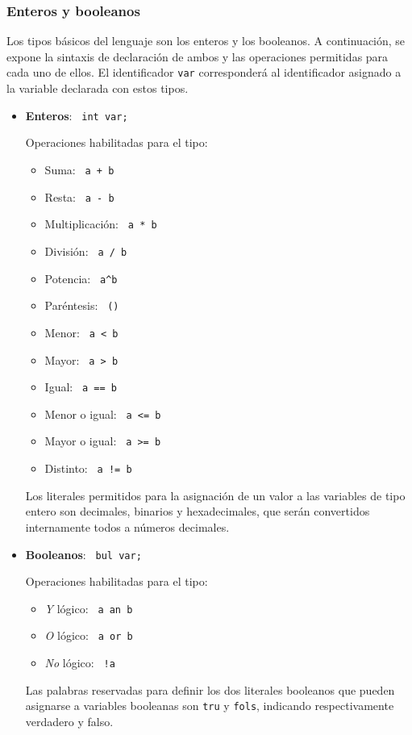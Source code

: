 \documentclass[10pt,a4paper]{article}
\begin{document}
\subsubsection{Enteros y booleanos}
Los tipos básicos del lenguaje son los enteros y los booleanos. A continuación, se expone la sintaxis de declaración de ambos y las operaciones permitidas para cada uno de ellos. El identificador \texttt{var} corresponderá al identificador asignado a la variable declarada con estos tipos.
\begin{itemize}
    \item \textbf{Enteros}: \texttt{\color{blue} int var;}
    
    Operaciones habilitadas para el tipo:
    \begin{itemize}
        \item Suma: \texttt{\color{blue} a + b}
        \item Resta: \texttt{\color{blue} a - b}
        \item Multiplicación: \texttt{\color{blue} a * b}
        \item División: \texttt{\color{blue} a / b}
        \item Potencia: \texttt{\color{blue} a\^{}b}
        \item Paréntesis: \texttt{\color{blue} ()}
        \item Menor: \texttt{\color{blue} a \textless{} b}
        \item Mayor: \texttt{\color{blue} a \textgreater{} b}
        \item Igual: \texttt{\color{blue} a == b}
        \item Menor o igual: \texttt{\color{blue} a \textless{}= b}
        \item Mayor o igual: \texttt{\color{blue} a \textgreater{}= b}
        \item Distinto: \texttt{\color{blue} a != b}
    \end{itemize}
    Los literales permitidos para la asignación de un valor a las variables de tipo entero son decimales, binarios y hexadecimales, que serán convertidos internamente todos a números decimales.

    \item \textbf{Booleanos}: \texttt{\color{blue} bul var;}
    
    Operaciones habilitadas para el tipo:
    \begin{itemize}
        \item \textit{Y} lógico: \texttt{\color{blue} a an b}
        \item \textit{O} lógico: \texttt{\color{blue} a or b}
        \item \textit{No} lógico: \texttt{\color{blue} !a}
    \end{itemize}
    Las palabras reservadas para definir los dos literales booleanos que pueden asignarse a variables booleanas son \texttt{\color{blue}tru} y \texttt{\color{blue}fols}, indicando respectivamente verdadero y falso.
\end{itemize}
\end{document}
